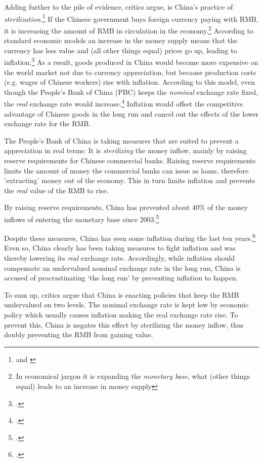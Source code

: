 Adding further to the pile of evidence, critics argue, is China's 
practice of \emph{sterilization}.\footnote{\cite{Humpage2010} and \cite[p. ?]{Wang2011}} If the Chinese government buys foreign 
currency paying with RMB, it is increasing the amount of RMB in 
circulation in the economy.\footnote{In economical jargon it is 
expanding the \emph{monetary base}, what (other things equal) leads to 
an increase in money supply} According to standard economic models an 
increase in the money supply means that the currency has less value and 
(all other things equal) prices go up, leading to 
inflation.\footnote{\cite[pp. 432]{Krugman2008}.}
As a result, goods produced in China would become more expensive on the 
world market not due to currency appreciation, but because production 
costs (e.g. wages of Chinese workers) rise with inflation. According to 
this model, even though the People's Bank of China (PBC) keeps the 
\emph{nominal} exchange rate fixed, the \emph{real} exchange rate would 
increase.\footnote{\cite[p. 509]{Krugman2008}.} Inflation would offset the 
competitive advantage of Chinese goods in the long run and cancel out 
the effects of the lower exchange rate for the RMB.

The People's Bank of China is taking measures that are suited to prevent 
a appreciation in real terms: It is \emph{sterilizing} the money inflow, 
mainly by raising reserve requirements for Chinese commercial banks.  
Raising reserve requirements limits the amount of money the commercial 
banks can issue as loans, therefore 'extracting' money out of the 
economy. This in turn limits inflation and prevents the \emph{real} 
value of the RMB to rise. 

By raising reserve requirements, China has prevented about 40\% of the money 
inflows of entering the monetary base since 2003.\footnote{\cite{Humpage2010}.}%

Despite these measures, China has seen some inflation during the last 
ten years.\footnote{\cite{Humpage2010}.} Even so, China clearly has been 
taking measures to fight inflation and was thereby lowering its 
\emph{real} exchange rate. Accordingly, while inflation should 
compensate an undervalued nominal exchange rate in the long run, China 
is accused of procrastinating `the long run' by preventing inflation to 
happen.

To sum up, critics argue that China is enacting policies that keep the 
RMB undervalued on two levels. The nonimal exchange rate is kept low by 
economic policy which usually causes inflation making the real exchange 
rate rise. To prevent this, China is negates this effect by sterilizing 
the money inflow, thus doubly preventing the RMB from gaining value.

